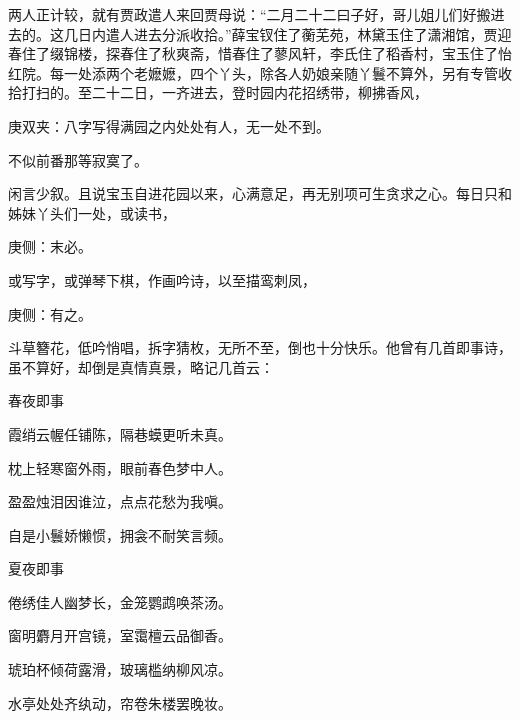 \begin{parag}
    两人正计较，就有贾政遣人来回贾母说：“二月二十二曰子好，哥儿姐儿们好搬进去的。这几日内遣人进去分派收拾。”薛宝钗住了蘅芜苑，林黛玉住了潇湘馆，贾迎春住了缀锦楼，探春住了秋爽斋，惜春住了蓼风轩，李氏住了稻香村，宝玉住了怡红院。每一处添两个老嬷嬷，四个丫头，除各人奶娘亲随丫鬟不算外，另有专管收拾打扫的。至二十二日，一齐进去，登时园内花招绣带，柳拂香风，\begin{note}庚双夹：八字写得满园之内处处有人，无一处不到。\end{note}不似前番那等寂寞了。
\end{parag}


\begin{parag}
    闲言少叙。且说宝玉自进花园以来，心满意足，再无别项可生贪求之心。每日只和姊妹丫头们一处，或读书，\begin{note}庚侧：末必。\end{note}或写字，或弹琴下棋，作画吟诗，以至描鸾刺凤，\begin{note}庚侧：有之。\end{note}斗草簪花，低吟悄唱，拆字猜枚，无所不至，倒也十分快乐。他曾有几首即事诗，虽不算好，却倒是真情真景，略记几首云：
\end{parag}


\begin{poem}
    \begin{pl}春夜即事\end{pl}

    \begin{pl}霞绡云幄任铺陈，隔巷蟆更听未真。\end{pl}

    \begin{pl}枕上轻寒窗外雨，眼前春色梦中人。\end{pl}

    \begin{pl}盈盈烛泪因谁泣，点点花愁为我嗔。\end{pl}

    \begin{pl}自是小鬟娇懒惯，拥衾不耐笑言频。\end{pl}
\end{poem}


\begin{poem}
    \begin{pl}夏夜即事\end{pl}

    \begin{pl}倦绣佳人幽梦长，金笼鹦鹉唤茶汤。\end{pl}

    \begin{pl}窗明麝月开宫镜，室霭檀云品御香。\end{pl}

    \begin{pl}琥珀杯倾荷露滑，玻璃槛纳柳风凉。\end{pl}

    \begin{pl}水亭处处齐纨动，帘卷朱楼罢晚妆。\end{pl}

\end{poem}


